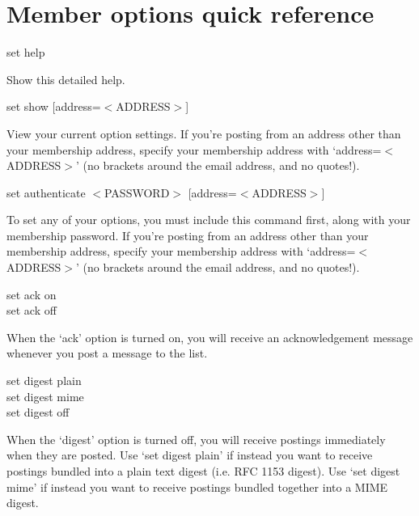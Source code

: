 \documentclass{howto}
\begin{document}
\section{Member options quick reference\label{a:options}}

\begin{list}{}{}
   \item set help
		\begin{list}{}{}
	        \item Show this detailed help.
		\end{list}

   \item {set show [address=$<$ADDRESS$>$]}
		\begin{list}{}{}
        \item View your current option settings.  If you're posting from an address
        other than your membership address, specify your membership address 
        with `address=$<$ADDRESS$>$' (no brackets around the email address, and no
        quotes!).
		\end{list}

   \item {set authenticate $<$PASSWORD$>$ [address=$<$ADDRESS$>$]}
		\begin{list}{}{}
        \item To set any of your options, you must include this command first, along
        with your membership password.  If you're posting from an address   
        other than your membership address, specify your membership address  
        with `address=$<$ADDRESS$>$' (no brackets around the email address, 
        and no quotes!).
		\end{list}

   \item set ack on\\
    set ack off
		\begin{list}{}{}
			\item
        When the `ack' option is turned on, you will receive an
        acknowledgement message whenever you post a message to the list.
		\end{list}

   \item set digest plain\\
    set digest mime\\
    set digest off
		\begin{list}{}{}
			\item
        When the `digest' option is turned off, you will receive postings
        immediately when they are posted.  Use `set digest plain' if instead
        you want to receive postings bundled into a plain text digest
        (i.e. RFC 1153 digest).  Use `set digest mime' if instead you want to
        receive postings bundled together into a MIME digest.
		\end{list}


\end{list}
\end{document}
